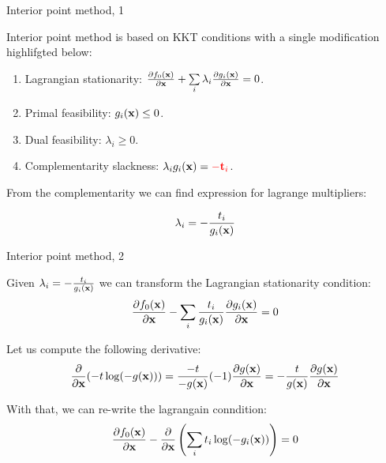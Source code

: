 \documentclass{beamer}
\begin{document}
\begin{frame}{Interior point method, 1}
	\begin{flushleft}
		
		Interior point method is based on KKT conditions with a single modification highlifgted below:
		
		\begin{enumerate}
			\item Lagrangian stationarity: $\frac{\partial f_0(\mathbf{x}) }{\partial \mathbf{x}} 
			+
			\sum\limits_i 
			\lambda_i  \frac{\partial g_i(\mathbf{x}) }{\partial \mathbf{x}} 
			= 0$.
			
			\item Primal feasibility: $g_i(\mathbf{x}) \leq 0$.
			
			\item Dual feasibility: $\lambda_i \geq 0$.
			
			\item Complementarity slackness: $\lambda_i g_i(\mathbf{x}) = \textcolor{red}{-\mathbf{t}_i}$.
		\end{enumerate}
		
		\bigskip
		
		From the complementarity we can find expression for lagrange multipliers:
		
		\begin{equation}
			\lambda_i = -\frac{t_i}{g_i(\mathbf{x})}
		\end{equation}
		
	\end{flushleft}
\end{frame}




\begin{frame}{Interior point method, 2}
	\begin{flushleft}
		
		Given $\lambda_i = -\frac{t_i}{g_i(\mathbf{x})}$ we can transform the Lagrangian stationarity condition:
		\begin{equation}
			\frac{\partial f_0(\mathbf{x})}{\partial \mathbf{x}} 
			-
			\sum\limits_i 
			\frac{t_i}{g_i(\mathbf{x})}
			\frac{\partial g_i(\mathbf{x})}{\partial \mathbf{x}} 
			= 0
		\end{equation}
		
		Let us compute the following derivative:
		\begin{align}
			\frac{\partial}{\partial \mathbf{x}} (  -t \log ( -g(\mathbf{x}) )  ) 
			= \frac{-t}{-g(\mathbf{x})} (-1) \frac{\partial g(\mathbf{x})}{\partial \mathbf{x}} 
			= -\frac{t}{g(\mathbf{x})} \frac{\partial g(\mathbf{x})}{\partial \mathbf{x}} 
		\end{align}
		
		With that, we can re-write the lagrangain conndition:
		\begin{equation}
			\frac{\partial f_0(\mathbf{x})}{\partial \mathbf{x}} 
			-
			\frac{\partial}{\partial \mathbf{x}} 
			\left(
			\sum\limits_i 
			t_i \log (- g_i (\mathbf{x})) 
			\right) = 0
		\end{equation}
		
		
	\end{flushleft}
\end{frame}
\end{document}
